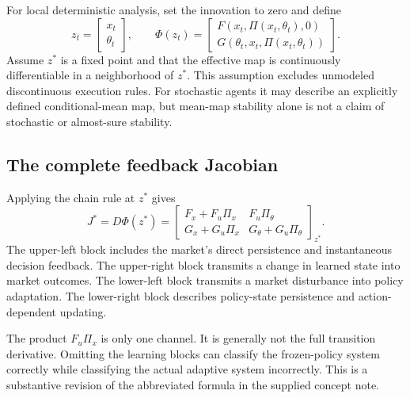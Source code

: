 \documentclass[11pt,a4paper]{article}
\theoremstyle{definition}
\theoremstyle{remark}
\begin{document}
For local deterministic analysis, set the innovation to zero and define
\begin{equation}
 z_t=\begin{bmatrix}x_t\\\theta_t\end{bmatrix},\qquad
 \Phi(z_t)=\begin{bmatrix}
 F(x_t,\Pi(x_t,\theta_t),0)\\
 G(\theta_t,x_t,\Pi(x_t,\theta_t))
 \end{bmatrix}.
 \label{eq:joint}
\end{equation}
Assume $z^*$ is a fixed point and that the effective map is continuously differentiable in a neighborhood of $z^*$. This assumption excludes unmodeled discontinuous execution rules. For stochastic agents it may describe an explicitly defined conditional-mean map, but mean-map stability alone is not a claim of stochastic or almost-sure stability.

\subsection{The complete feedback Jacobian}
Applying the chain rule at $z^*$ gives
\begin{equation}
 J^*=D\Phi(z^*)=
 \begin{bmatrix}
 F_x+F_u\Pi_x & F_u\Pi_\theta\\
 G_x+G_u\Pi_x & G_\theta+G_u\Pi_\theta
 \end{bmatrix}_{z^*}.
 \label{eq:fulljac}
\end{equation}
The upper-left block includes the market's direct persistence and instantaneous decision feedback. The upper-right block transmits a change in learned state into market outcomes. The lower-left block transmits a market disturbance into policy adaptation. The lower-right block describes policy-state persistence and action-dependent updating.

The product $F_u\Pi_x$ is only one channel. It is generally not the full transition derivative. Omitting the learning blocks can classify the frozen-policy system correctly while classifying the actual adaptive system incorrectly. This is a substantive revision of the abbreviated formula in the supplied concept note.
\end{document}
